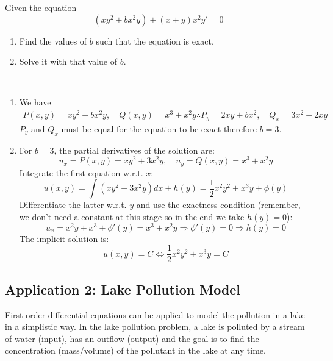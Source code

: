 \documentclass[a4paper]{article}
\begin{document}
\begin{exmp}
Given the equation 
    \[
        (xy^2 + bx^2y) + (x+y)x^2 y' = 0
    \]
\begin{enumerate}
    \item Find the values of $b$ such that the equation is exact.
    \item Solve it with that value of $b$.
\end{enumerate}
\end{exmp}
\begin{soln}
\quad \\
   \begin{enumerate}
       \item We have
           \begin{gather*}
               P(x,y) = xy^2 + bx^2y, \quad Q(x,y) = x^3 + x^2y
               \therefore P_y = 2xy + bx^2, \quad Q_x = 3x^2 + 2xy
           \end{gather*}
        $P_y$ and $Q_x$ must be equal for the equation to be exact therefore $b=3$.

        \item For $b=3$, the partial derivatives of the solution are:
            \[
                u_x = P(x,y) = xy^2 + 3x^2y, \quad u_y = Q(x,y) = x^3 + x^2y
            \]
            Integrate the first equation w.r.t. $x$:
            \[
                u(x,y) = \int(xy^2 + 3x^2y)dx + h(y) = \frac{1}{2} x^2y^2 + x^3y + \phi(y)
            \]
            Differentiate the latter w.r.t. $y$ and use the exactness condition (remember, we don't need a constant at this stage so in the end we take $h(y) = 0$):
            \[
                u_x = x^2y + x^3 + \phi'(y) = x^3  +x^2y \Rightarrow \phi'(y) = 0 \Rightarrow h(y) = 0
            \]
            The implicit solution is:
            \[
                u(x,y) = C \Leftrightarrow \frac{1}{2} x^2y^2 + x^3y = C
            \]
   \end{enumerate} 
\end{soln}


\subsection{Application 2: Lake Pollution Model}

First order differential equations can be applied to model the pollution in a lake in a simplistic way. In the lake pollution problem, a lake is polluted by a stream of water (input), has an outflow (output) and the goal is to find the concentration (mass/volume) of the pollutant in the lake at any time.
\end{document}

